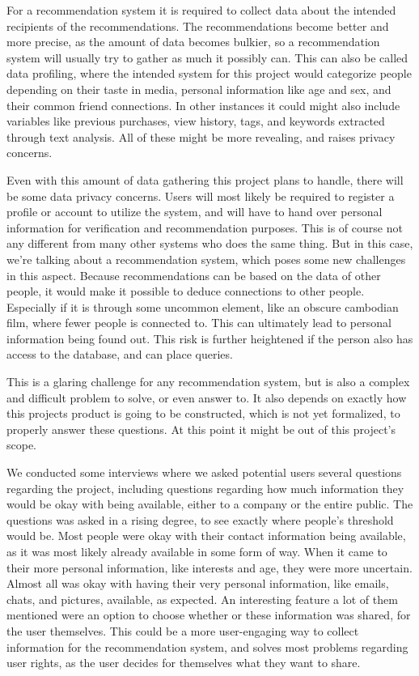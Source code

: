 For a recommendation system it is required to collect data about the intended recipients of the recommendations. The recommendations become better and more precise, as the amount of data becomes bulkier, so a recommendation system will usually try to gather as much it possibly can. This can also be called data profiling, where the intended system for this project would categorize people depending on their taste in media, personal information like age and sex, and their common friend connections. In other instances it could might also include variables like previous purchases, view history, tags, and keywords extracted through text analysis. All of these might be more revealing, and raises privacy concerns.

Even with this amount of data gathering this project plans to handle, there will be some data privacy concerns. Users will most likely be required to register a profile or account to utilize the system, and will have to hand over personal information for verification and recommendation purposes. This is of course not any different from many other systems who does the same thing. But in this case, we’re talking about a recommendation system, which poses some new challenges in this aspect. Because recommendations can be based on the data of other people, it would make it possible to deduce connections to other people. Especially if it is through some uncommon element, like an obscure cambodian film, where fewer people is connected to. This can ultimately lead to personal information being found out. This risk is further heightened if the person also has access to the database, and can place queries.

This is a glaring challenge for any recommendation system, but is also a complex and difficult problem to solve, or even answer to. It also depends on exactly how this projects product is going to be constructed, which is not yet formalized, to properly answer these questions. At this point it might be out of this project's scope.

We conducted some interviews where we asked potential users several questions regarding the project, including questions regarding how much information they would be okay with being available, either to a company or the entire public. The questions was asked in a rising degree, to see exactly where people’s threshold would be. Most people were okay with their contact information being available, as it was most likely already available in some form of way. When it came to their more personal information, like interests and age, they were more uncertain. Almost all was okay with having their very personal information, like emails, chats, and pictures, available, as expected. An interesting feature a lot of them mentioned were an option to choose whether or these information was shared, for the user themselves. This could be a more user-engaging way to collect information for the recommendation system, and solves most problems regarding user rights, as the user decides for themselves what they want to share.